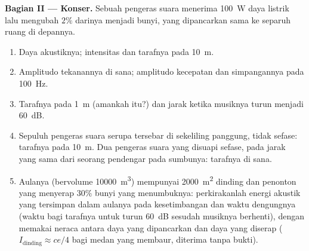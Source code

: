 \begin{problem}
\medskip
\noindent\textbf{Bagian II --- Konser.}
Sebuah pengeras suara menerima \qty{100}{W} daya listrik lalu mengubah
$2\%$ darinya menjadi bunyi, yang dipancarkan sama ke separuh ruang di depannya.
\begin{enumerate}[resume]
  \item Daya akustiknya; intensitas dan tarafnya pada \qty{10}{m}.
  \item Amplitudo tekanannya di sana; amplitudo kecepatan dan simpangannya
        pada \qty{100}{Hz}.
  \item Tarafnya pada \qty{1}{m} (amankah itu?) dan jarak ketika musiknya
        turun menjadi \qty{60}{dB}.
  \item Sepuluh pengeras suara serupa tersebar di sekeliling panggung, tidak
        sefase: tarafnya pada \qty{10}{m}. Dua pengeras suara yang disuapi sefase, pada
        jarak yang sama dari seorang pendengar pada sumbunya: tarafnya di sana.
  \item Aulanya (bervolume \qty{10000}{m^3}) mempunyai \qty{2000}{m^2} dinding dan penonton yang menyerap $30\%$
        bunyi yang menumbuknya: perkirakanlah energi akustik yang tersimpan dalam
        aulanya pada kesetimbangan dan waktu dengungnya (waktu bagi
        tarafnya untuk turun \qty{60}{dB} sesudah musiknya berhenti), dengan memakai
        neraca antara daya yang dipancarkan dan daya yang diserap
        ($I_{\text{dinding}} \approx ce/4$ bagi medan yang membaur, diterima tanpa bukti).
\end{enumerate}


\end{problem}
